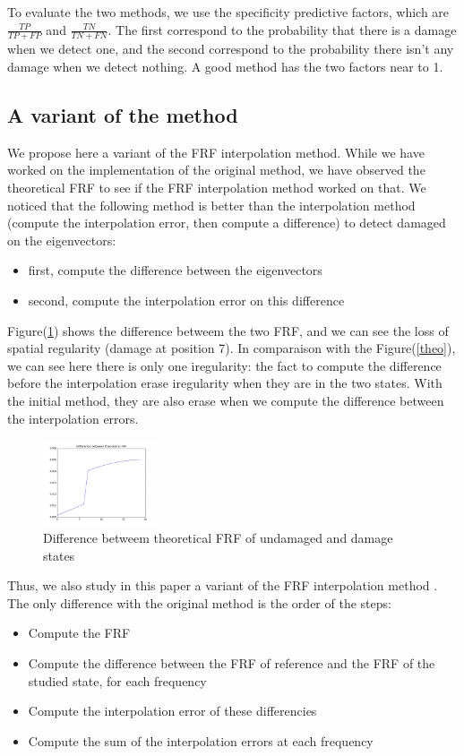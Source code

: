 \documentclass[journal]{IEEEtran}
\begin{document}
To evaluate the two methods, we use the specificity predictive factors, which are
$\frac{TP}{TP + FP}$ and $\frac{TN}{TN + FN}$. The first correspond to the probability that there is a damage when we detect one, and the second correspond to the probability there isn't any damage when we detect nothing. A good method has the two factors near to 1.


\subsection{A variant of the method}

We propose here a variant of the FRF interpolation method. While we have worked on the implementation of the original method, we have observed the theoretical FRF to see if the FRF interpolation method worked on that. We noticed that the following method is better than the interpolation method (compute the interpolation error, then compute a difference) to detect damaged on the eigenvectors:
\begin{itemize}
\item first, compute the difference between the eigenvectors
\item second, compute the interpolation error on this difference
\end{itemize}

Figure(\ref{theodiff}) shows the difference betweem the two FRF, and we can see the loss of spatial regularity (damage at position 7).
In comparaison with the Figure(\ref{theo}), we can see here there is only one iregularity: the fact to compute the difference before the interpolation erase iregularity when they are in the two states. With the initial method, they are also erase when we compute the difference between the interpolation errors.

\begin{figure}[h!]
  \centering
  \includegraphics[width=0.3\textwidth]{images/theodiff60.png}
  \caption{Difference betweem theoretical FRF of undamaged and damage states}
  \label{theodiff}
\end{figure}


Thus, we also study in this paper a variant of the FRF interpolation method . The only difference with the original method is the order of the steps:
\begin{itemize}
\item Compute the FRF
\item Compute the difference between the FRF of reference and the FRF of the studied state, for each frequency
\item Compute the interpolation error of these differencies
\item Compute the sum of the interpolation errors at each frequency
\end{itemize}
\end{document}
